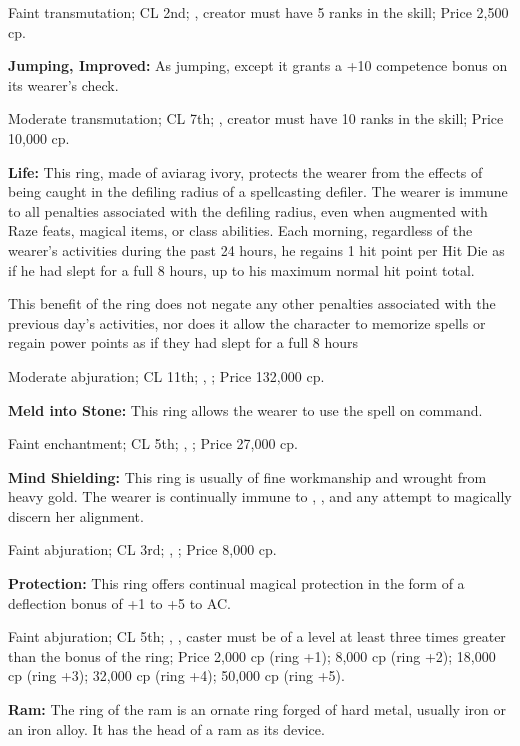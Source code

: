 Faint transmutation; CL 2nd; , creator must have 5 ranks in the  skill; Price 2,500 cp.


\textbf{Jumping, Improved:} As jumping, except it grants a +10 competence bonus on its wearer's  check.

Moderate transmutation; CL 7th; , creator must have 10 ranks in the  skill; Price 10,000 cp.


\textbf{Life:} This ring, made of aviarag ivory, protects the wearer from the effects of being caught in the defiling radius of a spellcasting defiler. The wearer is immune to all penalties associated with the defiling radius, even when augmented with Raze feats, magical items, or class abilities. Each morning, regardless of the wearer's activities during the past 24 hours, he regains 1 hit point per Hit Die as if he had slept for a full 8 hours, up to his maximum normal hit point total.

This benefit of the ring does not negate any other penalties associated with the previous day's activities, nor does it allow the character to memorize spells or regain power points as if they had slept for a full 8 hours

Moderate abjuration; CL 11th; , ; Price 132,000 cp.


\textbf{Meld into Stone:} This ring allows the wearer to use the spell  on command.

Faint enchantment; CL 5th; , ; Price 27,000 cp.


\textbf{Mind Shielding:} This ring is usually of fine workmanship and wrought from heavy gold. The wearer is continually immune to , , and any attempt to magically discern her alignment.

Faint abjuration; CL 3rd; , ; Price 8,000 cp.


\textbf{Protection:} This ring offers continual magical protection in the form of a deflection bonus of +1 to +5 to AC.

Faint abjuration; CL 5th; , , caster must be of a level at least three times greater than the bonus of the ring; Price 2,000 cp (ring +1); 8,000 cp (ring +2); 18,000 cp (ring +3); 32,000 cp (ring +4); 50,000 cp (ring +5).


\textbf{Ram:} The ring of the ram is an ornate ring forged of hard metal, usually iron or an iron alloy. It has the head of a ram as its device.

